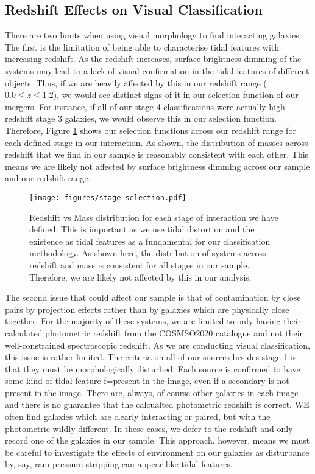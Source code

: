 \documentclass[fleqn,usenatbib]{mnras}
\begin{document}
\subsection{Redshift Effects on Visual Classification}
\noindent There are two limits when using visual morphology to find interacting galaxies. The first is the limitation of being able to characterise tidal features with increasing redshift. As the redshift increases, surface brightness dimming of the systems may lead to a lack of visual confirmation in the tidal features of different objects. Thus, if we are heavily affected by this in our redshift range ($0.0 \leq z \leq 1.2$), we would see distinct signs of it in our selection function of our mergers. For instance, if all of our stage 4 classifications were actually high redshift stage 3 galaxies, we would observe this in our selection function. Therefore, Figure \ref{fig:redshift_selection} shows our selection functions across our redshift range for each defined stage in our interaction. As shown, the distribution of masses across redshift that we find in our sample is reasonably consistent with each other. This means we are likely not affected by surface brightness dimming across our sample and our redshift range.

\begin{figure}
    \centering
    \texttt{[image: figures/stage-selection.pdf]}
    \caption{Redshift vs Mass distribution for each stage of interaction we have defined. This is important as we use tidal distortion and the existence as tidal features as a fundamental for our classification methodology. As shown here, the distribution of systems across redshift and mass is consistent for all stages in our sample. Therefore, we are likely not affected by this in our analysis.}
    \label{fig:redshift_selection}
\end{figure}

The second issue that could affect our sample is that of contamination by close pairs by projection effects rather than by galaxies which are physically close together. For the majority of these systems, we are limited to only having their calculated photometric redshift from the COSMSO2020 catalogue and not their well-constrained spectroscopic redshift. As we are conducting visual classification, this issue is rather limited. The criteria on all of our sources besides stage 1 is that they must be morphologically disturbed. Each source is confirmed to have some kind of tidal feature f=present in the image, even if a secondary is not present in the image. There are, always, of course other galaxies in each image and there is no guarantee that the calcualted photometric redshift is correct. WE often find galaxies which are clearly interacting or paired, but with the photometric wildly different. In these cases, we defer to the redshift and only record one of the galaxies in our sample. This approach, however, means we must be careful to investigate the effects of environment on our galaxies as disturbance by, say, ram pressure stripping can appear like tidal features.
\end{document}
